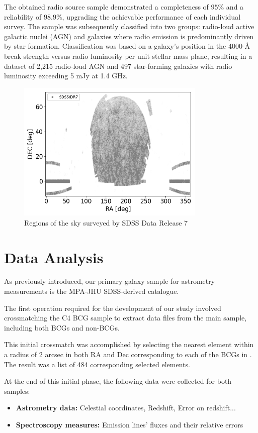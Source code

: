 The obtained radio source sample demonstrated a completeness of $95\%$ and a reliability of $98.9\%$, upgrading the achievable performance of each individual survey. The sample was subsequently classified into two groups: radio-loud active galactic nuclei (AGN) and galaxies where radio emission is predominantly driven by star formation. Classification was based on a galaxy's position in the 4000-Å break strength versus radio luminosity per unit stellar mass plane, resulting in a dataset of 2,215 radio-loud AGN and 497 star-forming galaxies with radio luminosity exceeding 5 mJy at 1.4 GHz.
\vspace{3cm}
\begin{figure}[hbtp]
  \centering
  \includegraphics[width=0.8\textwidth]{SDSS}
  \caption{Regions of the sky surveyed by SDSS Data Release 7}
  \label{3}
\end{figure}


\newpage
\section{Data Analysis}
As previously introduced, our primary galaxy sample for astrometry measurements is the MPA-JHU SDSS-derived catalogue.

The first operation required for the development of our study involved crossmatching the C4 BCG sample \cite{2009yCat..73790867V} to extract data files from the main sample, including both BCGs and non-BCGs.

This initial crossmatch was accomplished by selecting the nearest element within a radius of 2 arcsec in both RA and Dec corresponding to each of the BCGs in \cite{2009yCat..73790867V}. The result was a list of 484 corresponding selected elements.

At the end of this initial phase, the following data were collected for both samples:
\begin{itemize}
    \item \textbf{Astrometry data:} Celestial coordinates, Redshift, Error on redshift...
    \item \textbf{Spectroscopy measures:} Emission lines' fluxes and their relative errors
\end{itemize}

